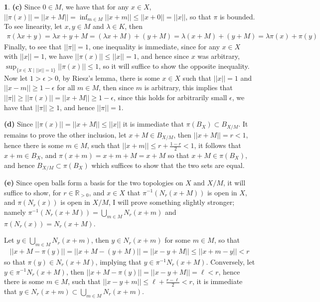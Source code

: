 \documentclass[10.5pt]{article}
\theoremstyle{definition}
\newtheorem{pb}{}
\newcommand{\set}[1]{\{#1\}}
\newcommand{\norm}[1]{\lvert\lvert#1\rvert\rvert}
\newcommand{\tand}{\text{ and }}
\begin{document}
\begin{pb}
            \textbf{(c)} Since \(0 \in M\), we have that for any \(x \in X\), \(\norm{\pi(x)} = \norm{x + M} = \inf_{m \in M}\norm{x + m} \leq \norm{x + 0} = \norm{x}\), so that \(\pi\) is bounded. To see linearity, let \(x,y \in M\) and \(\lambda \in K\), then
            \begin{align*}
                \pi(\lambda x + y) = \lambda x + y + M = (\lambda x + M) + (y + M) = \lambda(x + M) + (y + M) = \lambda\pi(x) + \pi(y)
            \end{align*}
            Finally, to see that \(\norm{\pi} = 1\), one inequality is immediate, since for any \(x \in X\) with \(\norm{x} = 1\), we have \(\norm{\pi(x)} \leq \norm{x} = 1\), and hence since \(x\) was arbitrary, \(\sup_{\set{x \in X \mid \norm{x} = 1}}\norm{\pi(x)} \leq 1\), so it will suffice to show the opposite inequality. Now let \(1 > \epsilon > 0\), by Riesz's lemma, there is some \(x \in X\) such that \(\norm{x} = 1\) and \(\norm{x - m} \geq 1 - \epsilon\) for all \(m \in M\), then since \(m\) is arbitrary, this implies that \(\norm{\pi} \geq \norm{\pi(x)} = \norm{x + M} \geq 1 - \epsilon\), since this holds for arbitrarily small \(\epsilon\), we have that \(\norm{\pi} \geq 1\), and hence \(\norm{\pi} = 1\).

            \textbf{(d)} Since \(\norm{\pi(x)} = \norm{x + M} \leq \norm{x}\) it is immediate that \(\pi(B_X) \subset B_{X/M}\). It remains to prove the other inclusion, let \(x + M \in B_{X/M}\), then \(\norm{x + M} = r < 1\), hence there is some \(m \in M\), such that \(\norm{x + m} \leq r + \frac{1 - r}{2} < 1\), it follows that \(x + m \in B_X\), and \(\pi(x + m) = x + m + M = x + M\) so that \(x + M \in \pi(B_{X})\), and hence \(B_{X/M} \subset \pi(B_X)\) which suffices to show that the two sets are equal.

            \textbf{(e)} Since open balls form a basis for the two topologies on \(X \tand X/M\), it will suffice to show, for \(r \in \mathbb{R}_{> 0}\), and \(x \in X\) that \(\pi^{-1}(N_r(x + M))\) is open in \(X\), and \(\pi(N_r(x))\) is open in \(X/M\), I will prove something slightly stronger; namely \(\pi^{-1}(N_r(x + M)) = \bigcup_{m \in M}N_r(x + m)\) and \(\pi(N_r(x)) = N_r(x + M)\).

            Let \(y \in \bigcup_{m \in M}N_r(x + m)\), then \(y \in N_r(x + m)\) for some \(m \in M\), so that
            \begin{align*}
                \norm{x + M - \pi(y)} = \norm{x + M - (y + M)} = \norm{x - y + M} \leq \norm{x + m - y} < r
            \end{align*}
            so that \(\pi(y) \in N_r(x + M)\), implying that \(y \in \pi^{-1}N_r(x+M)\). Conversely, let \(y \in \pi^{-1}N_r(x + M)\), then \(\norm{x + M - \pi(y)} = \norm{x - y + M} = \ell < r\), hence there is some \(m \in M\), such that \(\norm{x - y + m} \leq \ell + \frac{r - \ell}{2} < r\), it is immediate that \(y \in N_r(x + m) \subset \bigcup_{m \in M} N_r(x + m)\).


\end{pb}
\end{document}

